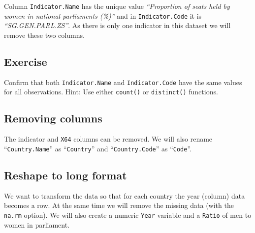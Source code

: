 \documentclass[a4paper,9pt,twocolumn,twoside,printwatermark=false]{pinp}
\begin{document}
Column \texttt{Indicator.Name} has the unique value \emph{``Proportion
of seats held by women in national parliaments (\%)''} and in
\texttt{Indicator.Code} it is \emph{``SG.GEN.PARL.ZS''}. As there is
only one indicator in this dataset we will remove these two columns.

\subsection{Exercise}\label{exercise-2}

Confirm that both \texttt{Indicator.Name} and \texttt{Indicator.Code}
have the same values for all observations. Hint: Use either
\texttt{count()} or \texttt{distinct()} functions.

\subsection{Removing columns}\label{removing-columns}

The indicator and \texttt{X64} columns can be removed. We will also
rename ``\texttt{Country.Name}'' as ``\texttt{Country}'' and
``\texttt{Country.Code}'' as ``\texttt{Code}''.

\begin{Shaded}
\end{Shaded}

\subsection{Reshape to long format}\label{reshape-to-long-format}

We want to transform the data so that for each country the year (column)
data becomes a row. At the same time we will remove the missing data
(with the \texttt{na.rm} option). We will also create a numeric
\texttt{Year} variable and a \texttt{Ratio} of men to women in
parliament.
\end{document}
